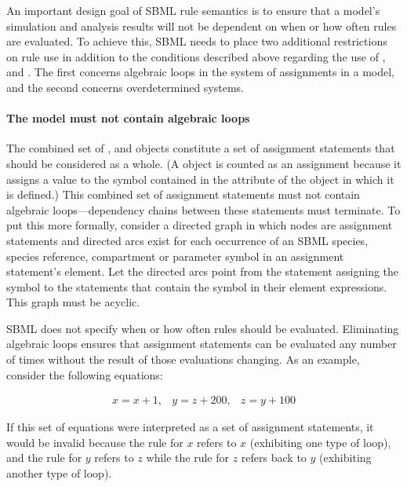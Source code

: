 An important design goal of SBML rule semantics is to ensure that
a model's simulation and analysis results will not be dependent on
when or how often rules are evaluated.  To achieve this, SBML
needs to place two additional restrictions on rule use in addition
to the conditions described above regarding the use of
\AlgebraicRule, \AssignmentRule and \RateRule.  The first concerns
algebraic loops in the system of assignments in a model, and the
second concerns overdetermined systems.


\paragraph{The model must not contain algebraic loops}

The combined set of \InitialAssignment, \AssignmentRule and
\KineticLaw objects constitute a set of assignment statements that
should be considered as a whole.  (A \KineticLaw object is counted
as an assignment because it assigns a value to the symbol
contained in the  attribute of the \Reaction object in which
it is defined.)  This combined set of assignment statements must
not contain algebraic loops---dependency chains between these
statements must terminate.  To put this more formally, consider a
directed graph in which nodes are assignment statements and
directed arcs exist for each occurrence of an SBML species, species reference,
compartment or parameter symbol in an assignment statement's
 element.  Let the directed arcs point from the
statement assigning the symbol to the statements that contain the
symbol in their  element expressions.  This graph must
be acyclic.

SBML does not specify when or how often rules should be evaluated.
Eliminating algebraic loops ensures that assignment statements can
be evaluated any number of times without the result of those
evaluations changing.  As an example, consider the following
equations:
\begin{linenomath}
\begin{equation*}
  \begin{array}{lll}
    x = x + 1, & y = z + 200, & z = y + 100
  \end{array}
\end{equation*}
\end{linenomath}
If this set of equations were interpreted as a set of assignment
statements, it would be invalid because the rule for $x$ refers to
$x$ (exhibiting one type of loop), and the rule for $y$ refers to
$z$ while the rule for $z$ refers back to $y$ (exhibiting another
type of loop).

